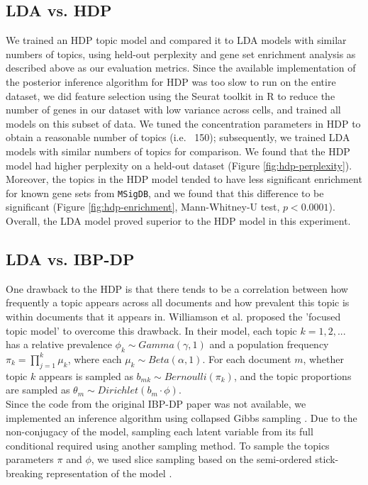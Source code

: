 \documentclass[11pt]{article}
\begin{document}
\subsection*{LDA vs. HDP}

We trained an HDP topic model and compared it to LDA models with similar numbers of topics, using held-out perplexity and gene set enrichment analysis as described above as our evaluation metrics. Since the available implementation of the posterior inference algorithm for HDP was too slow to run on the entire dataset, we did feature selection using the Seurat toolkit in R \cite{seurat} to reduce the number of genes in our dataset with low variance across cells, and trained all models on this subset of data. We tuned the concentration parameters in HDP to obtain a reasonable number of topics (i.e. ~150); subsequently, we trained LDA models with similar numbers of topics for comparison. We found that the HDP model had higher perplexity on a held-out dataset (Figure \ref{fig:hdp-perplexity}). Moreover, the topics in the HDP model tended to have less significant enrichment for known gene sets from \texttt{MSigDB}, and we found that this difference to be significant (Figure \ref{fig:hdp-enrichment}, Mann-Whitney-U test, $p<0.0001$). Overall, the LDA model proved superior to the HDP model in this experiment.

\subsection*{LDA vs. IBP-DP}
One drawback to the HDP is that there tends to be a correlation between how frequently a topic appears across all documents and how prevalent this topic is within documents that it appears in. Williamson et al. \cite{IBP} proposed the 'focused topic model' to overcome this drawback. In their model, each topic $k = 1,2,...$ has a relative prevalence $\phi_k \sim Gamma(\gamma, 1)$ and a population frequency $\pi_k = \prod^k_{j=1} \mu_k$, where each $\mu_k \sim Beta(\alpha, 1) $. For each document $m$, whether topic $k$ appears is sampled as $b_{mk} \sim Bernoulli(\pi_k)$, and the topic proportions are sampled as $\theta_m \sim Dirichlet(b_m \cdot \phi)$. \\

Since the code from the original IBP-DP paper was not available, we implemented an inference algorithm using collapsed Gibbs sampling \cite{IBP}. Due to the non-conjugacy of the model, sampling each latent variable from its full conditional required using another sampling method. To sample the topics parameters $\pi$ and $\phi$, we used slice sampling based on the semi-ordered stick-breaking representation of the model \cite{IBP2}.\\
\end{document}
